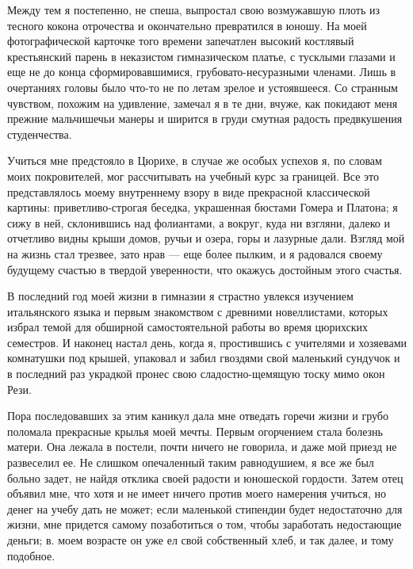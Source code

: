 Между тем я постепенно, не  спеша, выпростал свою возмужавшую плоть из
тесного кокона отрочества и окончательно  превратился в юношу. На моей
фотографической  карточке того  времени  запечатлен высокий  костлявый
крестьянский  парень в  неказистом  гимназическом  платье, с  тусклыми
глазами  и еще  не до  конца сформировавшимися,  грубовато-несуразными
членами. Лишь  в очертаниях головы  было что-то  не по летам  зрелое и
устоявшееся. Со странным  чувством, похожим на удивление,  замечал я в
те дни, вчуже, как покидают  меня прежние мальчишечьи манеры и ширится
в груди смутная радость предвкушения студенчества.

Учиться  мне  предстояло в  Цюрихе,  в  случае  же особых  успехов  я,
по  словам  моих  покровителей,   мог  рассчитывать  на  учебный  курс
за  границей.  Все  это   представлялось  моему  внутреннему  взору  в
виде  прекрасной  классической  картины:  приветливо-строгая  беседка,
украшенная бюстами  Гомера и  Платона; я сижу  в ней,  склонившись над
фолиантами, а вокруг, куда ни  взгляни, далеко и отчетливо видны крыши
домов, ручьи и  озера, горы и лазурные дали. Взгляд  мой на жизнь стал
трезвее, зато нрав --- еще более пылким, и я радовался своему будущему
счастью в твердой уверенности, что окажусь достойным этого счастья.

В последний  год моей  жизни в гимназии  я страстно  увлекся изучением
итальянского  языка  и  первым знакомством  с  древними  новеллистами,
которых  избрал темой  для  обширной самостоятельной  работы во  время
цюрихских семестров.  И наконец  настал день,  когда я,  простившись с
учителями и хозяевами комнатушки под крышей, упаковал и забил гвоздями
свой  маленький  сундучок  и  в последний  раз  украдкой  пронес  свою
сладостно-щемящую тоску мимо окон Рези.

Пора последовавших  за этим каникул  дала мне отведать горечи  жизни и
грубо поломала  прекрасные крылья моей мечты.  Первым огорчением стала
болезнь матери. Она лежала в постели, почти ничего не говорила, и даже
мой приезд не развеселил ее. Не слишком опечаленный таким равнодушием,
я все же был больно задет,  не найдя отклика своей радости и юношеской
гордости. Затем  отец объявил мне, что  хотя и не имеет  ничего против
моего  намерения  учиться, но  денег  на  учебу  дать не  может;  если
маленькой стипендии будет недостаточно  для жизни, мне придется самому
позаботиться  о  том, чтобы  заработать  недостающие  деньги; в.  моем
возрасте  он  уже ел  свой  собственный  хлеб,  и  так далее,  и  тому
подобное.

